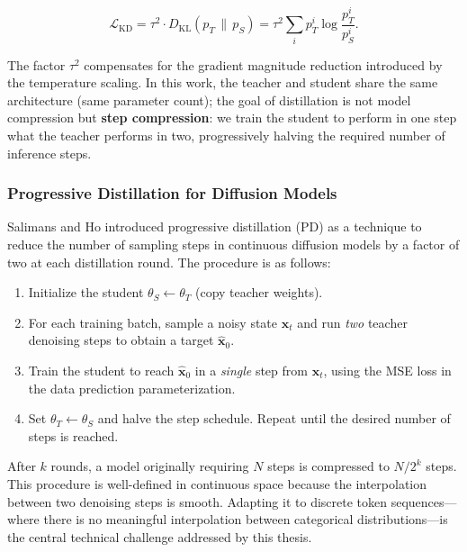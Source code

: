 \documentclass[11pt, a4paper]{article}
\begin{document}
\begin{equation}
    \mathcal{L}_{\text{KD}} = \tau^2 \cdot D_{\text{KL}}\!\left(p_T \,\|\, p_S\right)
    = \tau^2 \sum_i p_T^i \log \frac{p_T^i}{p_S^i}.
    \label{eq:kd_loss}
\end{equation}

\noindent The factor $\tau^2$ compensates for the gradient magnitude reduction introduced
by the temperature scaling. In this work, the teacher and student share the same
architecture (same parameter count); the goal of distillation is not model compression but
\textbf{step compression}: we train the student to perform in one step what the teacher
performs in two, progressively halving the required number of inference steps.

\subsubsection{Progressive Distillation for Diffusion Models}
\label{subsubsec:progressive_distillation}

Salimans and Ho \cite{salimans2022progressive} introduced progressive distillation (PD) as
a technique to reduce the number of sampling steps in continuous diffusion models by a
factor of two at each distillation round. The procedure is as follows:

\begin{enumerate}
    \item Initialize the student $\theta_S \leftarrow \theta_T$ (copy teacher weights).
    \item For each training batch, sample a noisy state $\mathbf{x}_t$ and run \emph{two}
          teacher denoising steps to obtain a target $\hat{\mathbf{x}}_0$.
    \item Train the student to reach $\hat{\mathbf{x}}_0$ in a \emph{single} step from
          $\mathbf{x}_t$, using the MSE loss in the data prediction parameterization.
    \item Set $\theta_T \leftarrow \theta_S$ and halve the step schedule. Repeat until
          the desired number of steps is reached.
\end{enumerate}

\noindent After $k$ rounds, a model originally requiring $N$ steps is compressed to
$N / 2^k$ steps. This procedure is well-defined in continuous space because the
interpolation between two denoising steps is smooth. Adapting it to discrete token
sequences---where there is no meaningful interpolation between categorical distributions---is
the central technical challenge addressed by this thesis.
\end{document}
